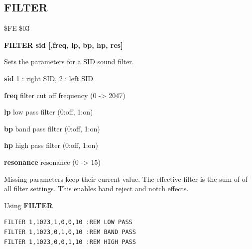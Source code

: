 
\newpage
\subsection{FILTER}
\begin{description}[leftmargin=2cm,style=nextline]
\item [Token:] \$FE \$03
\item [Format:] {\bf FILTER sid [,freq, lp, bp, hp, res]}
\item [Usage:] Sets the parameters for a SID sound filter.

      {\bf sid} 1 : right SID, 2 : left SID

      {\bf freq} filter cut off frequency (0 -> 2047)

      {\bf lp} low pass filter (0:off, 1:on)

      {\bf bp} band pass filter (0:off, 1:on)

      {\bf hp} high pass filter (0:off, 1:on)

      {\bf resonance} resonance (0 -> 15)

\item [Remarks:] Missing parameters keep their current value.
                 The effective filter is the sum of
                 of all filter settings.
                 This enables band reject and notch effects.

\item [Example:]
                Using {\bf FILTER}
\begin{tcolorbox}[colback=black,coltext=white]
\verbatimfont{\codefont}
\begin{verbatim}
FILTER 1,1023,1,0,0,10 :REM LOW PASS
FILTER 1,1023,0,1,0,10 :REM BAND PASS
FILTER 1,1023,0,0,1,10 :REM HIGH PASS
\end{verbatim}
\end{tcolorbox}
\end{description}


\newpage
